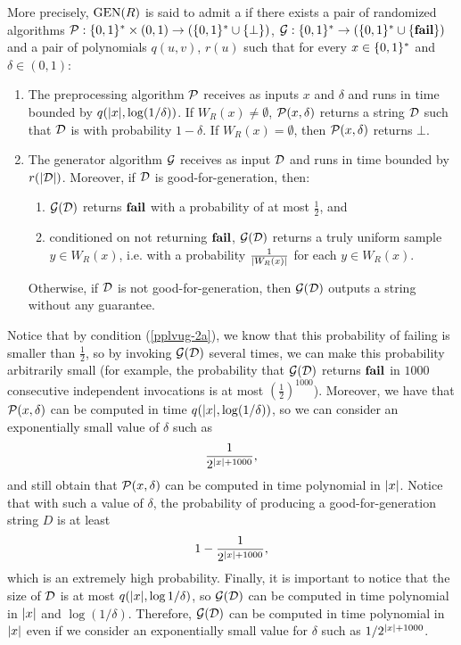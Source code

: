 \documentclass[11pt,twoside=off,numbers=noenddot]{scrbook}
\begin{document}
\begin{definition}[PPLVUG]
    More precisely, $\text{GEN}(R)$ is said to admit a  if there exists a pair of randomized algorithms $\mathcal{P} : \{ 0, 1 \}^\ast \times (0, 1) \to (\{ 0, 1 \}^\ast \cup \{ \bot \})$, $\mathcal{G} : \{ 0, 1 \}^\ast \to (\{ 0, 1 \}^\ast \cup \{ \textbf{fail} \})$ and a pair of polynomials $q(u, v)$, $r(u)$ such that for every $x \in \{ 0, 1 \}^\ast$ and $\delta \in (0, 1)$:
    \begin{enumerate}
        \item The preprocessing algorithm $\mathcal{P}$ receives as inputs $x$ and $\delta$ and runs in time bounded by $q(| x |, \log(1 / \delta))$. If $W_R(x) \neq \emptyset$, $\mathcal{P}(x, \delta)$ returns a string $\mathcal{D}$ such that $\mathcal{D}$ is  with probability $1 - \delta$. If $W_R(x) = \emptyset$, then $\mathcal{P}(x, \delta)$ returns $\bot$.
        \item The generator algorithm $\mathcal{G}$ receives as input $\mathcal{D}$ and runs in time bounded by $r(| \mathcal{D} |)$. Moreover, if $\mathcal{D}$ is good-for-generation, then:
              \begin{enumerate}
                  \item $\mathcal{G}(\mathcal{D})$ returns $\textbf{fail}$ with a probability of at most $\frac{1}{2}$, and \label{pplvug-2a}
                  \item conditioned on not returning $\textbf{fail}$, $\mathcal{G}(\mathcal{D})$ returns a truly uniform sample $y \in W_R(x)$, i.e. with a probability $\frac{1}{| W_R(x) |}$ for each $y \in W_R(x)$.
              \end{enumerate}
              Otherwise, if $\mathcal{D}$ is not good-for-generation, then $\mathcal{G}(\mathcal{D})$ outputs a string without any guarantee.
    \end{enumerate}
\end{definition}

Notice that by condition (\cref{pplvug-2a}), we know that this probability of failing is smaller than $\frac{1}{2}$, so by invoking $\mathcal{G}(\mathcal{D})$ several times, we can make this probability arbitrarily small (for example, the probability that $\mathcal{G}(\mathcal{D})$ returns $\textbf{fail}$ in $1000$ consecutive independent invocations is at most $(\frac{1}{2})^{1000}$). Moreover, we have that $\mathcal{P}(x, \delta)$ can be computed in time $q(| x |, \log(1 / \delta))$, so we can consider an exponentially small value of $\delta$ such as
\[ \frac{1}{2^{| x | + 1000}}, \]
and still obtain that $\mathcal{P}(x, \delta)$ can be computed in time polynomial in $| x |$. Notice that with such a value of $\delta$, the probability of producing a good-for-generation string $D$ is at least
\[ 1 - \frac{1}{2^{| x | + 1000}}, \]
which is an extremely high probability. Finally, it is important to notice that the size of $\mathcal{D}$ is at most $q(| x |, \log{1 / \delta})$, so $\mathcal{G}(\mathcal{D})$ can be computed in time polynomial in $| x |$ and $\log(1 / \delta)$. Therefore, $\mathcal{G}(\mathcal{D})$ can be computed in time polynomial in $| x |$ even if we consider an exponentially small value for $\delta$ such as $1 / 2^{| x | + 1000}$.
\end{document}
